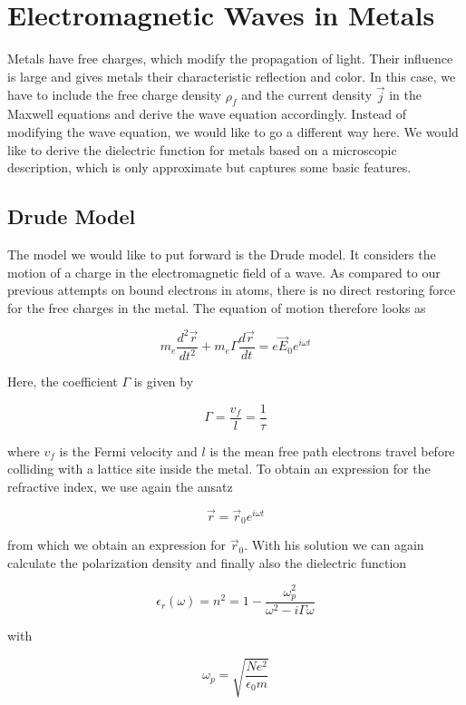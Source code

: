 \documentclass[
  a4paper,
]{book}
\begin{document}
\begin{tcolorbox}
\end{tcolorbox}

\chapter{Electromagnetic Waves in
Metals}\label{electromagnetic-waves-in-metals}

Metals have free charges, which modify the propagation of light. Their
influence is large and gives metals their characteristic reflection and
color. In this case, we have to include the free charge density
\(\rho_f\) and the current density \(\vec{j}\) in the Maxwell equations
and derive the wave equation accordingly. Instead of modifying the wave
equation, we would like to go a different way here. We would like to
derive the dielectric function for metals based on a microscopic
description, which is only approximate but captures some basic features.

\section{Drude Model}\label{drude-model}

The model we would like to put forward is the Drude model. It considers
the motion of a charge in the electromagnetic field of a wave. As
compared to our previous attempts on bound electrons in atoms, there is
no direct restoring force for the free charges in the metal. The
equation of motion therefore looks as

\[
m_e\frac{d^2\vec{r}}{dt^2}+m_e\Gamma \frac{d\vec{r}}{dt}=e\vec{E}_0 e^{i\omega t}
\]

Here, the coefficient \(\Gamma\) is given by

\[
\Gamma=\frac{v_f}{l}=\frac{1}{\tau}
\]

where \(v_f\) is the Fermi velocity and \(l\) is the mean free path
electrons travel before colliding with a lattice site inside the metal.
To obtain an expression for the refractive index, we use again the
ansatz

\[
\vec{r}=\vec{r}_0 e^{i\omega t}
\]

from which we obtain an expression for \(\vec{r}_0\). With his solution
we can again calculate the polarization density and finally also the
dielectric function

\[
\epsilon_r(\omega)=n^2=1-\frac{\omega_p^2}{\omega^2-i\Gamma \omega}
\]

with

\[
\omega_p=\sqrt{\frac{Ne^2}{\epsilon_0 m}}
\]
\end{document}
